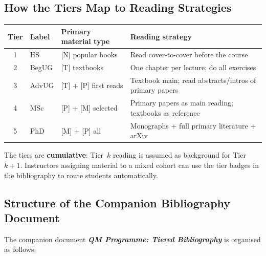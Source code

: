 \documentclass[11pt,a4paper]{article}
\begin{document}
\subsection{How the Tiers Map to Reading Strategies}

\begin{center}
\begin{tabular}{clp{3.8cm}p{5cm}}
\toprule
\textbf{Tier} & \textbf{Label} & \textbf{Primary material type} & \textbf{Reading strategy}\\
\midrule
1 & HS       & [N] popular books     & Read cover-to-cover before the course\\
2 & BegUG    & [T] textbooks         & One chapter per lecture; do all exercises\\
3 & AdvUG    & [T] + [P] first reads & Textbook main; read abstracts/intros of primary papers\\
4 & MSc      & [P] + [M] selected    & Primary papers as main reading; textbooks as reference\\
5 & PhD      & [M] + [P] all         & Monographs + full primary literature + arXiv\\
\bottomrule
\end{tabular}
\end{center}

\medskip
The tiers are \textbf{cumulative}: Tier~$k$ reading is assumed as background for
Tier~$k{+}1$. Instructors assigning material to a mixed cohort can use the tier badges
in the bibliography to route students automatically.

\subsection{Structure of the Companion Bibliography Document}

The companion document \textbf{\textit{QM Programme: Tiered Bibliography}} is organised
as follows:
\end{document}
